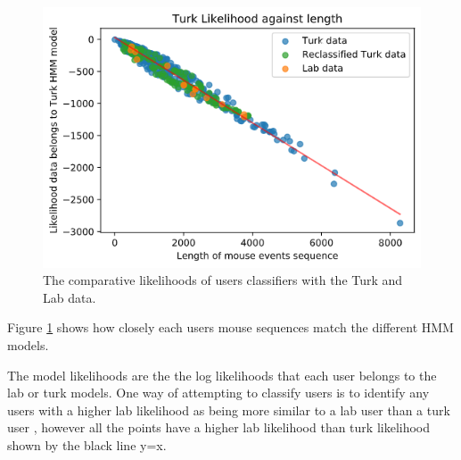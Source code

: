 \documentclass{article}
\begin{document}
\begin{figure}[ht!]
    \centering
    \includegraphics[scale=0.5]{Images/Turk-Lab-Liklihoods.png}
    \caption{The comparative likelihoods of users classifiers with the Turk and Lab data. }
    \label{fig:TurkLabLikli}
\end{figure}

Figure \ref{fig:TurkLabLikli} shows how closely each users mouse sequences match the different HMM models.

The model likelihoods are the the log likelihoods that each user belongs to the lab or turk models. 
One way of attempting to classify users is to identify any users with a higher lab likelihood as being more similar to a lab user than a turk user
, however all the points have a higher lab likelihood than turk likelihood shown by the black line y=x.

\end{document}
